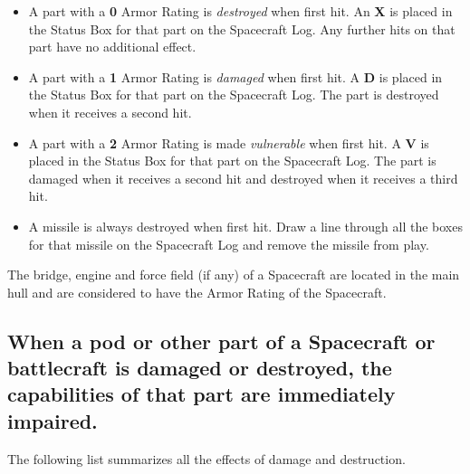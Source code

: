 \begin{itemize}
\item A part with a \textbf{0} Armor Rating is \emph{destroyed} when
  first hit. An \textbf{\textsf{X}} is placed in the Status Box for that part
  on the Spacecraft Log. Any further hits on that part have no
  additional effect.
\item A part with a \textbf{1} Armor Rating is \emph{damaged} when
  first hit. A \textbf{D} is placed in the Status Box for that part on
  the Spacecraft Log. The part is destroyed when it receives a second
  hit.
\item A part with a \textbf{2} Armor Rating is made \emph{vulnerable}
  when first hit. A \textbf{V} is placed in the Status Box for that
  part on the Spacecraft Log.  The part is damaged when it receives a
  second hit and destroyed when it receives a third hit.
\item A missile is always destroyed when first hit. Draw a line
  through all the boxes for that missile on the Spacecraft Log and
  remove the missile from play.
\end{itemize}

The bridge, engine and force field (if any) of a Spacecraft are
located in the main hull and are considered to have the Armor Rating
of the Spacecraft.

\subsection[Damage And Capabilities]{When a pod or other part of a
  Spacecraft or battlecraft is damaged or destroyed, the capabilities
  of that  
  part are immediately impaired.}
\label{sec:damage-capabilities}



The following list summarizes all the effects of damage and destruction. 

